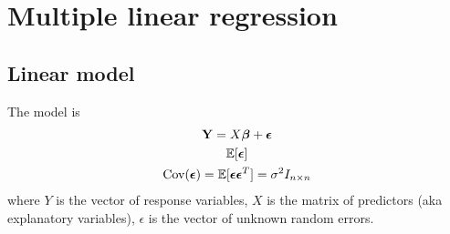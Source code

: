 \section{Multiple linear regression}
\subsection{Linear model}
\begin{theory}
 The model is
 \begin{gather*}
 \mathbf{Y} = X \boldsymbol{\beta} + \boldsymbol{\epsilon}\\
 \mathbb{E}[\boldsymbol{\epsilon}]\\
 \operatorname{Cov}(\boldsymbol{\epsilon}) = \mathbb{E}[\boldsymbol{\epsilon}\boldsymbol{\epsilon}^T] = \sigma^2 I_{n\times n}
 \end{gather*}
 where $Y$ is the vector of response variables, $X$ is the matrix of predictors (aka explanatory variables), $\epsilon$ is the vector of unknown random errors.
\end{theory}

